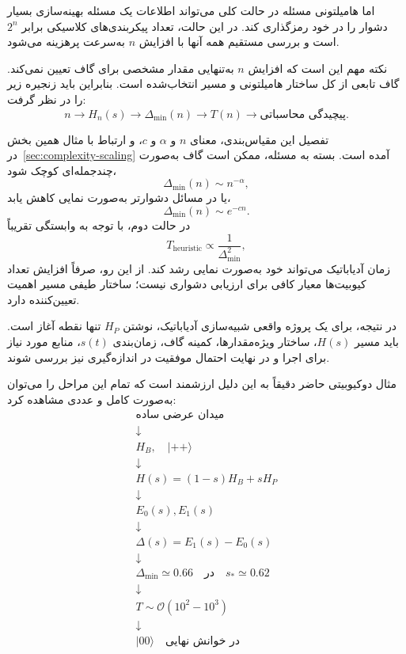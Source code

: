 اما هامیلتونی مسئله در حالت کلی می‌تواند اطلاعات یک مسئله بهینه‌سازی بسیار دشوار را در خود رمزگذاری کند. در این حالت، تعداد پیکربندی‌های کلاسیکی برابر $2^n$ است و بررسی مستقیم همه آنها با افزایش $n$ به‌سرعت پرهزینه می‌شود.

نکته مهم این است که افزایش $n$ به‌تنهایی مقدار مشخصی برای گاف تعیین نمی‌کند. گاف تابعی از کل ساختار هامیلتونی و مسیر انتخاب‌شده است. بنابراین باید زنجیره زیر را در نظر گرفت:
\begin{equation}
	n
	\longrightarrow
	H_n(s)
	\longrightarrow
	\Delta_{\min}(n)
	\longrightarrow
	T(n)
	\longrightarrow
	\text{پیچیدگی محاسباتی}.
\end{equation}

تفصیل این مقیاس‌بندی، معنای $n$ و $\alpha$ و $c$، و ارتباط با مثال همین بخش در~\ref{sec:complexity-scaling} آمده است.
بسته به مسئله، ممکن است گاف به‌صورت چندجمله‌ای کوچک شود،
\begin{equation}
	\Delta_{\min}(n)\sim n^{-\alpha},
\end{equation}
یا در مسائل دشوارتر به‌صورت نمایی کاهش یابد،
\begin{equation}
	\Delta_{\min}(n)\sim e^{-cn}.
\end{equation}
در حالت دوم، با توجه به وابستگی تقریباً
\begin{equation}
	T_{\mathrm{heuristic}}\propto\frac{1}{\Delta_{\min}^2},
\end{equation}
زمان آدیاباتیک می‌تواند خود به‌صورت نمایی رشد کند. از این رو، صرفاً افزایش تعداد کیوبیت‌ها معیار کافی برای ارزیابی دشواری نیست؛ ساختار طیفی مسیر اهمیت تعیین‌کننده دارد.

در نتیجه، برای یک پروژه واقعی شبیه‌سازی آدیاباتیک، نوشتن $H_P$ تنها نقطه آغاز است. باید مسیر $H(s)$، ساختار ویژه‌مقدارها، کمینه گاف، زمان‌بندی $s(t)$، منابع مورد نیاز برای اجرا و در نهایت احتمال موفقیت در اندازه‌گیری نیز بررسی شوند.

مثال دوکیوبیتی حاضر دقیقاً به این دلیل ارزشمند است که تمام این مراحل را می‌توان به‌صورت کامل و عددی مشاهده کرد:
\begin{equation}
	\boxed{
		\begin{array}{c}
			\text{میدان عرضی ساده}
			\\[2pt]
			\downarrow
			\\[2pt]
			H_B,\quad \lvert++\rangle
			\\[4pt]
			\downarrow
			\\[2pt]
			H(s)=(1-s)H_B+sH_P
			\\[4pt]
			\downarrow
			\\[2pt]
			E_0(s),E_1(s)
			\\[4pt]
			\downarrow
			\\[2pt]
			\Delta(s)=E_1(s)-E_0(s)
			\\[4pt]
			\downarrow
			\\[2pt]
			\Delta_{\min}\simeq0.66
			\quad\text{در}\quad
			s_*\simeq0.62
			\\[4pt]
			\downarrow
			\\[2pt]
			T\sim\mathcal{O}(10^2\!-\!10^3)
			\\[4pt]
			\downarrow
			\\[2pt]
			\lvert00\rangle
			\quad\text{در خوانش نهایی}
		\end{array}
	}
\end{equation}


